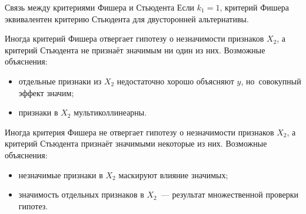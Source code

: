 \documentclass[9pt,pdf,utf8,hyperref={unicode},aspectratio=169]{beamer}
\begin{document}
\begin{frame}{Связь между критериями Фишера и Стьюдента}
    Если $k_1=1$, критерий Фишера эквивалентен критерию Стьюдента для двусторонней альтернативы.

    \bigskip

    Иногда критерий Фишера отвергает гипотезу о незначимости признаков $X_2$, а критерий Стьюдента не признаёт значимым ни один из них. Возможные объяснения:
    \begin{itemize}
    \item отдельные признаки из $X_2$ недостаточно хорошо объясняют $y$, но~совокупный эффект значим;
    \item признаки в $X_2$ мультиколлинеарны.
    \end{itemize}

    \bigskip

    Иногда критерия Фишера не отвергает гипотезу о незначимости признаков $X_2$, а критерий Стьюдента признаёт значимыми некоторые из них. Возможные объяснения:
    \begin{itemize}
    \item незначимые признаки в $X_2$ маскируют влияние значимых;
    \item значимость отдельных признаков в $X_2$~--- результат множественной проверки гипотез.
    \end{itemize}
\end{frame}
\end{document}
